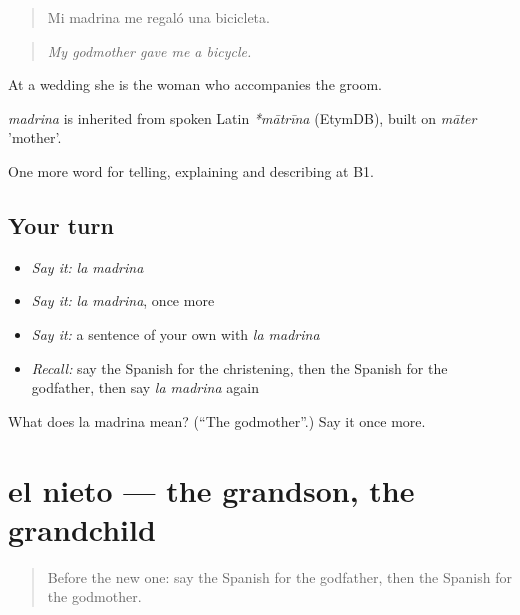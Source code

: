 \begin{quote}
Mi madrina me regaló una bicicleta.
\end{quote}

\begin{quote}
\emph{My godmother gave me a bicycle.}
\end{quote}

At a wedding she is the woman who accompanies the groom.

\begin{cousinweb}
\emph{madrina} is inherited from spoken Latin \emph{*mātrīna} (EtymDB), built on \emph{māter} 'mother'.
\end{cousinweb}

\begin{grammarlens}[title={What you've built}]
One more word for telling, explaining and describing at B1.
\end{grammarlens}

\subsection*{Your turn}
\begin{itemize}
\raggedright
  \item \emph{Say it:} \emph{la madrina}
  \item \emph{Say it:} \emph{la madrina}, once more
  \item \emph{Say it:} a sentence of your own with \emph{la madrina}
  \item \emph{Recall:} say the Spanish for the christening, then the Spanish for the godfather, then say \emph{la madrina} again
\end{itemize}

\begin{tcolorbox}[breakable,colback=teal!4,colframe=teal!35!black,title={Before you move on}]
What does la madrina mean? (\textquotedblleft{}The godmother\textquotedblright{}.) Say it once more.
\end{tcolorbox}
\section[el nieto]{el nieto — the grandson, the grandchild}

\label{lesson:ES-C546-nieto}



\begin{quote}
Before the new one: say the Spanish for the godfather, then the Spanish for the godmother.
\end{quote}

